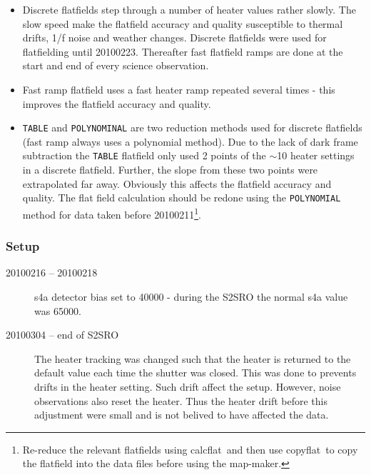 \documentclass[twoside,11pt]{article}
\newcommand{\about}{$\sim$}
\newcommand{\xref}[3]{#1}
\renewcommand{\_}{\texttt{\symbol{95}}}
\newcommand{\task}[1]{\textsf{#1}}
\newcommand{\param}[1]{\texttt{#1}}
\newcommand{\copyflat}{\xref{\task{copyflat}}{sun258}{COPYFLAT}}
\newcommand{\calcflat}{\xref{\task{calcflat}}{sun258}{CALCFLAT}}
\begin{document}
\begin{itemize}
\item Discrete flatfields step through a number of heater values
  rather slowly. The slow speed make the flatfield accuracy and
  quality susceptible to thermal drifts, 1/f noise and weather
  changes. Discrete flatfields were used for flatfielding until
  20100223. Thereafter fast flatfield ramps are done at the start and
  end of every science observation.

\item Fast ramp flatfield uses a fast heater ramp repeated several
  times - this improves the flatfield accuracy and quality.

\item \param{TABLE} and \param{POLYNOMINAL} are two reduction methods
  used for discrete flatfields (fast ramp always uses a polynomial
  method). Due to the lack of dark frame subtraction the \param{TABLE}
  flatfield only used 2 points of the \about10 heater settings in a
  discrete flatfield. Further, the slope from these two points were
  extrapolated far away.  Obviously this affects the flatfield
  accuracy and quality. The flat field calculation should be redone
  using the \param{POLYNOMIAL} method for data taken before
  20100211\footnote{Re-reduce the relevant flatfields using \calcflat\
    and then use \copyflat\ to copy the flatfield into the data files
    before using the map-maker.}.

\end{itemize}

\subsubsection{Setup}

\begin{description}

\item[20100216 -- 20100218] \mbox{}

  s4a detector bias set to 40000 - during the S2SRO the normal s4a value
  was 65000.

\item[20100304 -- end of S2SRO] \mbox{}

  The heater tracking was changed such that the heater is returned to
  the default value each time the shutter was closed. This was done to
  prevents drifts in the heater setting. Such drift affect the
  setup. However, noise observations also reset the heater. Thus the
  heater drift before this adjustment were small and is not belived to
  have affected the data.

\end{description}
\end{document}
